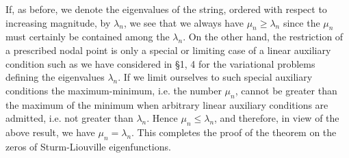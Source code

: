 If, as before, we denote the eigenvalues of the string, ordered with respect to increasing magnitude, by $\lambda_n$, we see that we always have $\mu_n\ge\lambda_n$ since the $\mu_n$ must certainly be contained among the $\lambda_n$. On the other hand, the restriction of a prescribed nodal point is only a special or limiting case of a linear auxiliary condition such as we have considered in \S1, 4 for the variational problems defining the eigenvalues $\lambda_n$. If we limit ourselves to such special auxiliary conditions the maximum-minimum, i.e. the number $\mu_n$, cannot be greater than the maximum of the minimum when arbitrary linear auxiliary conditions are admitted, i.e. not greater than $\lambda_n$. Hence $\mu_n\le\lambda_n$, and therefore, in view of the above result, we have $\mu_n=\lambda_n$. This completes the proof of the theorem on the zeros of Sturm-Liouville eigenfunctions.


